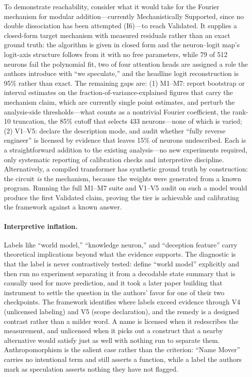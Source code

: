 \documentclass{article}
\begin{document}
To demonstrate reachability, consider what it would take for the Fourier mechanism for modular addition---currently Mechanistically Supported, since no double dissociation has been attempted (I6)---to reach Validated. It supplies a closed-form target mechanism with measured residuals rather than an exact ground truth: the algorithm is given in closed form and the neuron--logit map's logit-axis structure follows from it with no free parameters, while 79 of 512 neurons fail the polynomial fit, two of four attention heads are assigned a role the authors introduce with ``we speculate,'' and the headline logit reconstruction is 95\% rather than exact. The remaining gaps are: (1) M1--M7: report bootstrap or interval estimates on the fraction-of-variance-explained figures that carry the mechanism claim, which are currently single point estimates, and perturb the analysis-side thresholds---what counts as a nontrivial Fourier coefficient, the rank-10 truncation, the 85\% cutoff that selects 433 neurons---none of which is varied; (2) V1--V5: declare the description mode, and audit whether ``fully reverse engineer'' is licensed by evidence that leaves 15\% of neurons undescribed. Each is a straightforward addition to the existing analysis---no new experiments required, only systematic reporting of calibration checks and interpretive discipline. Alternatively, a compiled transformer \citep{lindner2024interp} has synthetic ground truth by construction: the circuit \emph{is} the mechanism, because the weights were generated from a known program. Running the full M1--M7 suite and V1--V5 audit on such a model would produce the first Validated claim, proving the tier is achievable and calibrating the framework against a known answer.

\paragraph{Interpretive inflation.} Labels like ``world model,'' ``knowledge neuron,'' and ``deception feature'' carry theoretical implications beyond what the evidence supports. The diagnostic is that the label is never contrastively tested: \citet{li2023othello} define ``world model'' explicitly and then run no experiment separating it from a decodable state summary that is causally used for move prediction, and it took a later paper building that instrument to settle the question in the authors' favor for one of their two checkpoints. The framework identifies where labels exceed evidence through V4 (unlicensed labeling) and V5 (scope declaration), and the remedy is a designed contrast rather than a milder word. A name is licensed when it redescribes the measurement, and unlicensed when it picks out a construct that a nearby alternative would satisfy just as well with nothing run to separate them. Anthropomorphism is the salient case rather than the criterion: ``Name Mover'' carries no intentional term and still asserts a function, while a label the authors mark as speculation asserts nothing they have not flagged.
\end{document}
